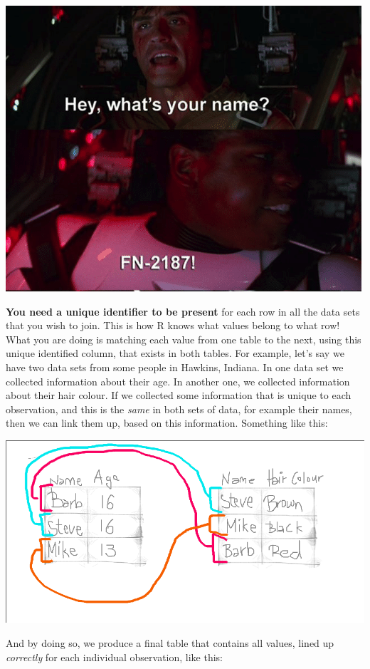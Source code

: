 \documentclass[
]{book}
\begin{document}
\includegraphics{img/fn2187.png}

\textbf{You need a unique identifier to be present} for each row in all the data sets that you wish to join. This is how R knows what values belong to what row! What you are doing is matching each value from one table to the next, using this unique identified column, that exists in both tables. For example, let's say we have two data sets from some people in Hawkins, Indiana. In one data set we collected information about their age. In another one, we collected information about their hair colour. If we collected some information that is unique to each observation, and this is the \emph{same} in both sets of data, for example their names, then we can link them up, based on this information. Something like this:

\includegraphics{img/merge_logic_1.png}

And by doing so, we produce a final table that contains all values, lined up \emph{correctly} for each individual observation, like this:
\end{document}
